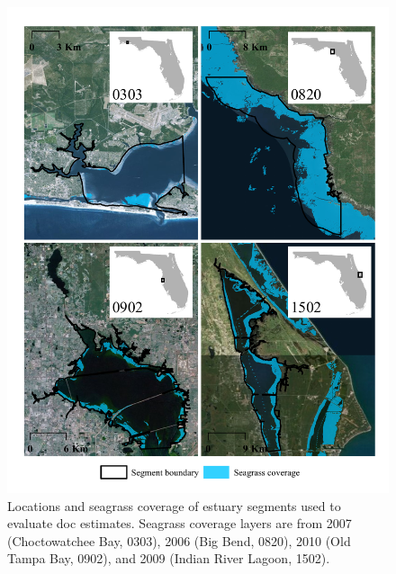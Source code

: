 \documentclass[letterpaper,12pt,oneside]{article}\usepackage[]{graphicx}\usepackage[]{color}
\begin{document}
\clearpage


\begin{figure}
\centerline{\includegraphics[width = \textwidth]{figs/seg_all.pdf}}
\caption{Locations and seagrass coverage of estuary segments used to evaluate \acl{doc} estimates.  Seagrass coverage layers are from 2007 (Choctowatchee Bay, 0303), 2006 (Big Bend, 0820), 2010 (Old Tampa Bay, 0902), and 2009 (Indian River Lagoon, 1502).}
\label{fig:seg_all}
\end{figure}
\end{document}
